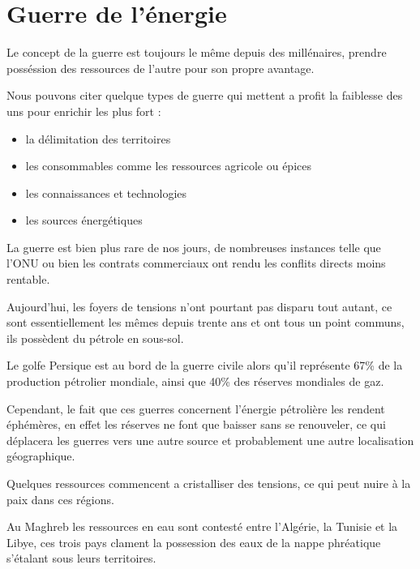 \section{Guerre de l'énergie}
\vskip -15pt

Le concept de la guerre est toujours le même depuis des millénaires, prendre posséssion des
ressources de l'autre pour son propre avantage.

Nous pouvons citer quelque types de guerre qui mettent a profit la faiblesse des uns
pour enrichir les plus fort :

\begin{itemize}
  \item la délimitation des territoires %
  \item les consommables comme les ressources agricole ou épices
  \item les connaissances et technologies
  \item les sources énergétiques
\end{itemize}

La guerre est bien plus rare de nos jours, de nombreuses instances telle que l'ONU ou bien les
contrats commerciaux ont rendu les conflits directs moins rentable.

Aujourd'hui, les foyers de tensions n’ont pourtant pas disparu tout autant,
ce sont essentiellement les mêmes depuis trente ans et ont tous un point communs,
ils possèdent du pétrole en sous-sol.

Le golfe Persique est au bord de la guerre civile alors qu'il représente 67\%
de la production pétrolier mondiale, ainsi que 40\% des réserves mondiales de gaz.

Cependant, le fait que ces guerres concernent l'énergie pétrolière les rendent éphémères,
en effet les réserves ne font que baisser sans se renouveler, ce qui déplacera les
guerres vers une autre source et probablement une autre localisation géographique.

Quelques ressources commencent a cristalliser des tensions, ce qui peut nuire à la paix
dans ces régions.

Au Maghreb les ressources en eau sont contesté entre l'Algérie, la Tunisie et la Libye, ces
trois pays clament la possession des eaux de la nappe phréatique s'étalant sous leurs
territoires.

